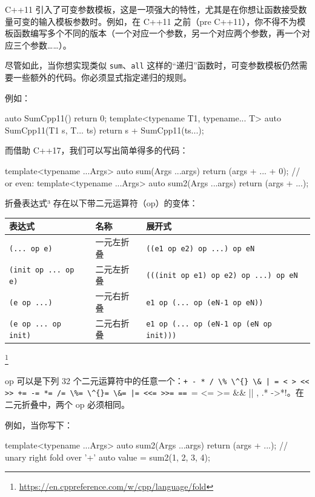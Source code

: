 C++11 引入了可变参数模板，这是一项强大的特性，尤其是在你想让函数接受数量可变的输入模板参数时。例如，在 C++11 之前（pre C++11），你不得不为模板函数编写多个不同的版本（一个对应一个参数，另一个对应两个参数，再一个对应三个参数……）。

尽管如此，当你想实现类似 \texttt{sum}、\texttt{all} 这样的“递归”函数时，可变参数模板仍然需要一些额外的代码。你必须显式指定递归的规则。

例如：

\begin{codebox}[cpp]
auto SumCpp11(){
return 0;
}
template<typename T1, typename... T>
auto SumCpp11(T1 s, T... ts){
return s + SumCpp11(ts...);
}
\end{codebox}

而借助 C++17，我们可以写出简单得多的代码：

\begin{codebox}[cpp]
template<typename ...Args> auto sum(Args ...args)
{
return (args + ... + 0);
}
// or even:
template<typename ...Args> auto sum2(Args ...args)
{
return (args + ...);
}
\end{codebox}

折叠表达式³ 存在以下带二元运算符（op）的变体：

\begin{table}[H]
\centering
\begin{tabularx}{\textwidth}{X X X}
\toprule
表达式 & 名称 & 展开式 \\
\midrule
\texttt{(... op e)} & 一元左折叠 & \texttt{((e1 op e2) op ...) op eN} \\
\texttt{(init op ... op e)} & 二元左折叠 & \texttt{(((init op e1) op e2) op ...) op eN} \\
\texttt{(e op ...)} & 一元右折叠 & \texttt{e1 op (... op (eN-1 op eN))} \\
\texttt{(e op ... op init)} & 二元右折叠 & \texttt{e1 op (... op (eN-1 op (eN op init)))} \\
\bottomrule
\end{tabularx}
\end{table}

\footnote{\url{https://en.cppreference.com/w/cpp/language/fold}}

op 可以是下列 32 个二元运算符中的任意一个：\verb!+ - * / \% \^{} \& | = < > << >> += -= *= /= \%= \^{}= \&= |= <<= >>= == != <= >= \&\& || , .* ->*!。在二元折叠中，两个 op 必须相同。

例如，当你写下：

\begin{codebox}[cpp]
template<typename ...Args> auto sum2(Args ...args)
{
return (args + ...); // unary right fold over '+'
}
auto value = sum2(1, 2, 3, 4);
\end{codebox}

